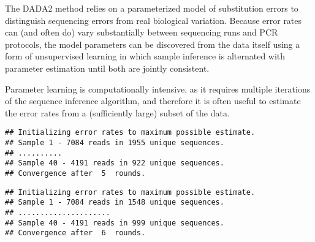 The DADA2 method relies on a parameterized model of substitution
errors to distinguish sequencing errors from real biological
variation. Because error rates can (and often do) vary substantially
between sequencing runs and PCR protocols, the model parameters can be
discovered from the data itself using a form of unsupervised learning
in which sample inference is alternated with parameter estimation
until both are jointly consistent.

Parameter learning is computationally intensive, as it requires
multiple iterations of the sequence inference algorithm, and therefore
it is often useful to estimate the error rates from a (sufficiently
large) subset of the data.

\begin{knitrout}
\color{fgcolor}\begin{kframe}
\begin{alltt}
 \hlkwb{<-} \hlstd{(derepFs[}\hlopt{:}\hlstd{],} \hlstd{=}\hlstd{,} \hlstd{=}\hlstd{)}
\end{alltt}


{\ttfamily\noindent\itshape\color{messagecolor}{\#\# Initial error matrix unspecified. Error rates will be initialized to the maximum possible estimate from this data.}}\begin{verbatim}
## Initializing error rates to maximum possible estimate.
## Sample 1 - 7084 reads in 1955 unique sequences.
## ..........
## Sample 40 - 4191 reads in 922 unique sequences.
## Convergence after  5  rounds.
\end{verbatim}
\begin{alltt}
 \hlkwb{<-} \hlstd{(derepRs[}\hlopt{:}\hlstd{],} \hlstd{=}\hlstd{,} \hlstd{=}\hlstd{)}
\end{alltt}


{\ttfamily\noindent\itshape\color{messagecolor}{\#\# Initial error matrix unspecified. Error rates will be initialized to the maximum possible estimate from this data.}}\begin{verbatim}
## Initializing error rates to maximum possible estimate.
## Sample 1 - 7084 reads in 1548 unique sequences.
## .....................
## Sample 40 - 4191 reads in 999 unique sequences.
## Convergence after  6  rounds.
\end{verbatim}
\end{kframe}
\end{knitrout}

